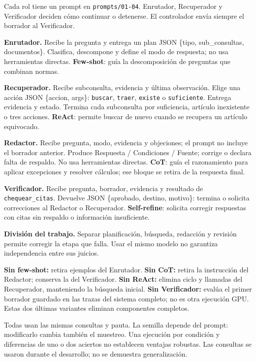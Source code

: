 \documentclass[10pt,a4paper]{article}
\newcommand{\seccion}[1]{\par\vspace{3pt}{\color{azul}\bfseries\fontsize{10}{11}\selectfont #1}\par\vspace{1pt}}
\newcommand{\rol}[1]{{\color{azul}\bfseries #1}}
\begin{document}
\noindent\begin{minipage}[t]{0.486\linewidth}
\fontsize{9}{10.4}\selectfont
\seccion{3. Roles, contratos y técnicas}
Cada rol tiene un prompt en \texttt{prompts/01-04}. Enrutador, Recuperador y Verificador deciden cómo continuar o detenerse. El controlador envía siempre el borrador al Verificador.

\rol{Enrutador.} Recibe la pregunta y entrega un plan JSON \{tipo, sub\_consultas, documentos\}. Clasifica, descompone y define el modo de respuesta; no usa herramientas directas. \textbf{Few-shot}: guía la descomposición de preguntas que combinan normas.

\rol{Recuperador.} Recibe subconsulta, evidencia y última observación. Elige una acción JSON \{accion, args\}: \texttt{buscar}, \texttt{traer}, \texttt{existe} o \texttt{suficiente}. Entrega evidencia y estado. Termina cada subconsulta por suficiencia, artículo inexistente o tres acciones. \textbf{ReAct}: permite buscar de nuevo cuando se recupera un artículo equivocado.

\rol{Redactor.} Recibe pregunta, modo, evidencia y objeciones; el prompt no incluye el borrador anterior. Produce Respuesta / Condiciones / Fuente; corrige o declara falta de respaldo. No usa herramientas directas. \textbf{CoT}: guía el razonamiento para aplicar excepciones y resolver cálculos; ese bloque se retira de la respuesta final.

\rol{Verificador.} Recibe pregunta, borrador, evidencia y resultado de \texttt{chequear\_citas}. Devuelve JSON \{aprobado, destino, motivo\}: termina o solicita correcciones al Redactor o Recuperador. \textbf{Self-refine}: solicita corregir respuestas con citas sin respaldo o información insuficiente.

\textbf{División del trabajo.} Separar planificación, búsqueda, redacción y revisión permite corregir la etapa que falla. Usar el mismo modelo no garantiza independencia entre sus juicios.

\seccion{4. Ablaciones y alcance}
\textbf{Sin few-shot:} retira ejemplos del Enrutador. \textbf{Sin CoT:} retira la instrucción del Redactor; conserva la del Verificador. \textbf{Sin ReAct:} elimina ciclo y llamadas del Recuperador, manteniendo la búsqueda inicial. \textbf{Sin Verificador:} evalúa el primer borrador guardado en las trazas del sistema completo; no es otra ejecución GPU. Estas dos últimas variantes eliminan componentes completos.

Todas usan las mismas consultas y pauta. La semilla depende del prompt: modificarlo cambia también el muestreo. Una ejecución por condición y diferencias de uno o dos aciertos no establecen ventajas robustas. Las consultas se usaron durante el desarrollo; no se demuestra generalización.
\end{minipage}\hfill
\end{document}
